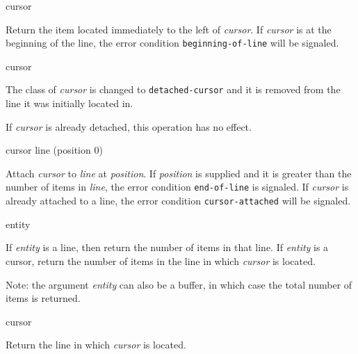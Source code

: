  {cursor}

Return the item located immediately to the left of \textit{cursor}.
If \emph{cursor} is at the beginning of the line, the error condition
\texttt{beginning-of-line} will be signaled.

 {cursor}

The class of \textit{cursor} is changed to \texttt{detached-cursor}
and it is removed from the line it was initially located in. 

If \textit{cursor} is already detached, this operation has no effect.

 {cursor line \optional (position 0)}

Attach \textit{cursor} to \textit{line} at \textit{position}.  If
\textit{position} is supplied and it is greater than the number of
items in \textit{line}, the error condition \texttt{end-of-line} is
signaled.  If \textit{cursor} is already attached to a line, the error
condition \texttt{cursor-attached} will be signaled.

 {entity}

If \textit{entity} is a line, then return the number of items in that
line.  If \textit{entity} is a cursor, return the number of items in
the line in which \textit{cursor} is located.

Note: the argument \textit{entity} can also be a buffer, in which case
the total number of items is returned.

 {cursor}

Return the line in which \textit{cursor} is located. 
